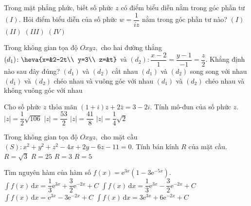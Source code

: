 \begin{ex}%
Trong mặt phẳng phức, biết số phức $z$ có điểm biểu diễn nằm trong góc phần tư $(I)$. Hỏi điểm biểu diễn của số phức $w=\dfrac1{iz}$ nằm trong góc phần tư nào?
\choice
{$(I)$}
{$(II)$}
{\True $(III)$}
{$(IV)$}
\end{ex}

\begin{ex}%
Trong không gian tọa độ $Oxyz,$ cho hai đường thẳng $(d_1)\colon \heva{x=&2-2t\\ y=3\\ z=&t}$ và $(d_2)\colon \dfrac{x-2}1=\dfrac{y-1}{-1}=\dfrac z2.$ Khẳng định nào sau đây đúng?
\choice
{$(d_1)$ và $(d_2)$ cắt nhau}
{$(d_1)$ và $(d_2)$ song song với nhau}
{\True $(d_1)$ và $(d_2)$ chéo nhau và vuông góc với nhau}
{$(d_1)$ và $(d_2)$ chéo nhau và không vuông góc với nhau}
\end{ex}

\begin{ex}%
Cho số phức $z$ thỏa mãn $(1+i)z+2\bar{z}=3-2i.$ Tính mô-đun của số phức $z$.
\choice
{\True $|z|=\dfrac12\sqrt{106}$}
{$|z|=\dfrac{53}2$}
{$|z|=\dfrac{41}8$}
{$|z|=\dfrac14\sqrt{2}$}
\end{ex}

\begin{ex}%
Trong không gian tọa độ $Oxyz,$ cho mặt cầu $(S)\colon x^2+y^2+z^2-4x+2y-6z-11=0.$ Tính bán kính $R$ của mặt cầu.
\choice
{$R=\sqrt3$}
{$R=25$}
{$R=3$}
{\True $R=5$}
\end{ex}

\begin{ex}%
Tìm nguyên hàm của hàm số $f(x)=\mathrm{e}^{3x}\left(1-3\mathrm{e}^{-5x}\right).$
\choice
{\True $\displaystyle \int f(x)\mathrm{\,d}x=\dfrac13\mathrm{e}^{3x}+\dfrac32\mathrm{e}^{-2x}+C$}
{$\displaystyle \int f(x)\mathrm{\,d}x=\dfrac13\mathrm{e}^{3x}-\dfrac32\mathrm{e}^{-2x}+C$}
{$\displaystyle \int f(x)\mathrm{\,d}x=\mathrm{e}^{3x}-3\mathrm{e}^{-2x}+C$}
{$\displaystyle \int f(x)\mathrm{\,d}x=3\mathrm{e}^{3x}+6\mathrm{e}^{-2x}+C$}
\end{ex}


